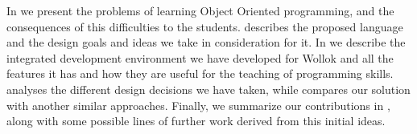 
\medskip 
In  we present the problems of learning Object Oriented programming, and the consequences of this difficulties to the students.  describes the proposed language and the design goals and ideas we take in consideration for it. In  we describe the integrated development environment we have developed for Wollok and all the features it has and how they are useful for the teaching of programming skills.  analyses the different design decisions we have taken, while  compares our solution with another similar approaches. Finally, we summarize our contributions in ,
along with some possible lines of further work derived from this initial ideas. 


